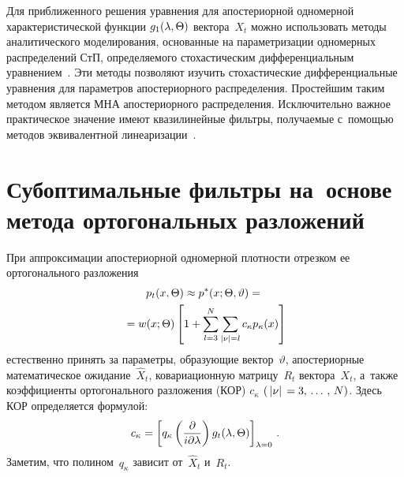 \begin{multicols}{2}
 Для приближенного решения уравнения  для апостериорной
одномерной характеристической функции  $g_1(\lambda, \Theta)$ вектора~$X_t$ можно
использовать\linebreak
 методы аналитического моделирования, основанные на 
параметризации одномерных
 распределений СтП, определяемого стохастическим
 дифференциальным уравнением~\cite{8-s1}.  Эти методы
 позволя\-ют изучить
 стохастические дифференциальные уравнения для параметров
 апостериорного распределения. Простейшим таким методом является
 МНА апостериорного распределения.
Исключительно важное практическое значение имеют квазилинейные
фильтры, получаемые с~помощью методов эквивалентной линеаризации~\cite{8-s1}.

\section{Субоптимальные фильтры на~основе метода ортогональных разложений}

При аппроксимации апостериорной одномерной плотности отрезком ее ортогонального 
разложения~\cite{1-s1, 2-s1}
\begin{multline}
p_t (x, \Theta)\approx p^* (x; \Theta, \vartheta) = {}\\
{}=
w (x; \Theta) \left[ 1+ \sum\limits_{l=3}^N \sum\limits_{|\nu | =l} c_\kappa p_\kappa (x)\right]
\label{e3.1-s1}
\end{multline}
естественно принять за параметры,  образующие вектор~$\vartheta$, 
апостериорные математическое
 ожидание~$\hat X_t$, ковариационную матрицу~$R_t$ вектора~$X_t$, а~также
 коэффициенты ортогонального разложения (КОР) $c_\kappa$ $(\lv \nu\rv \hm= 3\tr N)$.
 Здесь КОР определяется формулой:
\begin{equation}
c_\kappa = \left[ q_\kappa \left(\displaystyle\frac{\displaystyle \partial \mathstrut}{\displaystyle i\partial \lambda\mathstrut}\right) 
g_t (\lambda,\Theta)\right]_{\lambda=0}\,.\label{e3.2-s1}
\end{equation}
Заметим, что полином~$q_\kappa$ зависит от~$\hat X_t$ и~$R_t$.


\end{multicols}
